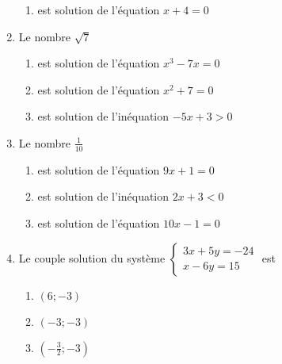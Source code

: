 \documentclass[oneside,twocolumn,landscape]{book}
\begin{document}
\begin{enumerate}
\begin{enumerate}
\item\MauvaiseReponse est solution de l'équation $x+4=0$


\end{enumerate}



\item Le nombre $\sqrt{7}$

\begin{enumerate}

\item\BonneReponse est solution de l'équation $x^{3}-7x=0$
\item\MauvaiseReponse est solution de l'équation $x^{2}+7=0$


\item\MauvaiseReponse est solution de l'inéquation $-5x+3>0$

\end{enumerate}

\newpage

\item Le nombre $\frac{1}{10}$

\begin{enumerate}

\item\MauvaiseReponse est solution de l'équation $9x+1=0$


\item\MauvaiseReponse est solution de l'inéquation $2x+3<0$
\item\BonneReponse est solution de l'équation $10x-1=0$

\end{enumerate}


\item Le couple solution du système $\left\{\begin{array}{c}3x+5y=-24 \\ x-6y=15\end{array}\right.$ est

\begin{enumerate}

\item\MauvaiseReponse $(6;-3)$

\item\BonneReponse $(-3 ;-3)$
\item\MauvaiseReponse $(-\frac{3}{2} ; -3)$


\end{enumerate}









\end{enumerate}
\end{document}
